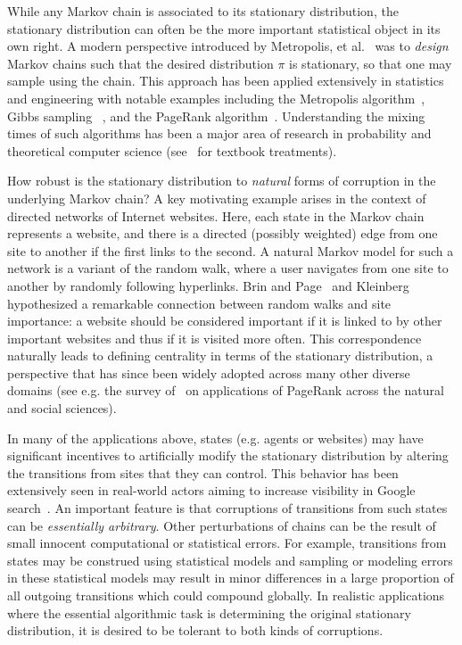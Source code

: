 \documentclass[11pt]{article}
\theoremstyle{remark}
\begin{document}
While any Markov chain is associated to its stationary distribution, the stationary distribution can often be the more important statistical object in its own right. A modern perspective introduced by Metropolis, et al.~\cite{metropolis1953equation} was to \emph{design} Markov chains such that the desired distribution $\pi$ is stationary, so that one may sample using the chain. This approach has been applied extensively in statistics and engineering with notable examples including the Metropolis algorithm~\cite{metropolis1953equation}, Gibbs sampling ~\cite{geman1984stochastic}, and the PageRank algorithm~\cite{brin1998anatomy}. 
Understanding the mixing times of such algorithms has been a major area of research in probability and theoretical computer science (see~\cite{montenegro2006mathematical,levin2017markov} for textbook treatments). 

How robust is the stationary distribution to \emph{natural} forms of corruption in the underlying Markov chain? A key motivating example arises in the context of directed networks of Internet websites. Here, each state in the Markov chain represents a website, and there is a directed (possibly weighted) edge from one site to another if the first links to the second. A natural Markov model for such a network is a variant of the random walk, where a user navigates from one site to another by randomly following hyperlinks. Brin and Page~\cite{brin1998anatomy} and Kleinberg~\cite{DBLP:journals/jacm/Kleinberg99} hypothesized a remarkable connection between random walks and site importance: a website should be considered important if it is linked to by other important websites and thus if it is visited more often. This correspondence naturally leads to defining centrality in terms of the stationary distribution, a perspective that has since been widely adopted across many other diverse domains (see e.g. the survey of~\cite{DBLP:journals/siamrev/Gleich15} on applications of PageRank across the natural and social sciences).

In many of the applications above, states (e.g. agents or websites) may have significant incentives to artificially %
modify the 
stationary distribution by altering the transitions from sites that they can control. This behavior has been extensively seen in real-world actors aiming to increase visibility in Google search~\cite{genius,parasite}. An important feature is that corruptions of transitions from such states can be \emph{essentially arbitrary}. 
Other perturbations of chains can be the result of small innocent computational or statistical errors. 
For example, transitions from states may be construed using statistical models 
and sampling or modeling errors in these statistical models may result in minor differences in a large proportion of all outgoing transitions which could compound globally. In realistic applications where the essential algorithmic task is determining the original stationary distribution, it is desired to be tolerant to both kinds of corruptions.
\end{document}

